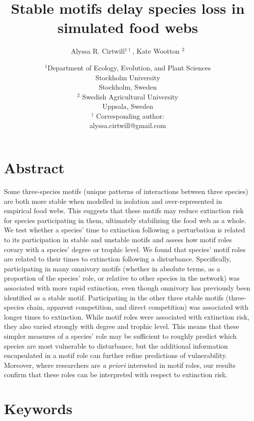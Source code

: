 \documentclass[12pt]{article}
\title{Stable motifs delay species loss in simulated food webs}
\author{Alyssa R. Cirtwill$^{1\dagger}$, Kate Wootton $^{2}$}
\date{\small$^1$Department of Ecology, Evolution, and Plant Sciences\\ 
Stockholm University\\
Stockholm, Sweden\\
\medskip
\small$^2$ Swedish Agricultural University\\
Uppsala, Sweden\\
\medskip
$^\dagger$ Corresponding author:\\
alyssa.cirtwill@gmail.com\\
 }
\begin{document}
 
\maketitle 
\raggedright
\setlength{\parindent}{15pt} 

\clearpage
\linenumbers
\begin{spacing}{2.0}

\section*{Abstract} %
    Some three-species motifs (unique patterns of interactions between three species) are both more stable when modelled in isolation and over-represented in empirical food webs. This suggests that these motifs may reduce extinction risk for species participating in them, ultimately stabilizing the food web as a whole. 
    We test whether a species' time to extinction following a perturbation is related to its participation in stable and unstable motifs and assess how motif roles covary with a species' degree or trophic level.
    We found that species' motif roles are related to their times to extinction following a disturbance. Specifically, participating in many omnivory motifs (whether in absolute terms, as a proportion of the species' role, or relative to other species in the network) was associated with more rapid extinction, even though omnivory has previously been identified as a stable motif. Participating in the other three stable motifs (three-species chain, apparent competition, and direct competition) was associated with longer times to extinction.
    While motif roles were associated with extinction risk, they also varied strongly with degree and trophic level. This means that these simpler measures of a species' role may be sufficient to roughly predict which species are most vulnerable to disturbance, but the additional information encapsulated in a motif role can further refine predictions of vulnerability. Moreover, where researchers are \emph{a priori} interested in motif roles, our results confirm that these roles can be interpreted with respect to extinction risk.%

\section*{Keywords}


\end{spacing}
\end{document}
